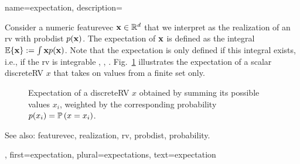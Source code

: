 {name={expectation},
	description={Consider a numeric \gls{featurevec} ${\bf x} \in \mathbb{R}^{d}$ 
		that we interpret as the \gls{realization} of an \gls{rv} with \gls{probdist} $p({\bf x})$. 
		The expectation of ${\bf x}$ is defined as the integral $\mathbb{E} \{ {\bf x} \} := \int {\bf x} p({\bf x})$. 
		Note that the expectation is only defined if this integral exists, i.e., if the \gls{rv} is \gls{integrable} 
		\cite{RudinBookPrinciplesMatheAnalysis}, \cite{BillingsleyProbMeasure}, \cite{HalmosMeasure}. 
		Fig.\ \ref{fig_expect_discrete_dict} illustrates the expectation of a scalar \gls{discreteRV} $x$ that takes on values 
		from a finite set only. 
   		\begin{figure}[H]
   			\begin{center}
			\end{center}
			\vspace*{-5mm}
		\caption{Expectation of a \gls{discreteRV} $x$ obtained by summing its possible values $x_{i}$, weighted 
			by the corresponding \gls{probability} $p(x_i) = \mathbb{P}\left(x= x_i\right)$. \label{fig_expect_discrete_dict}}
 		\end{figure}
		See also: \gls{featurevec}, \gls{realization}, \gls{rv}, \gls{probdist}, \gls{probability}.},
	first={expectation},
	plural={expectations},
	text={expectation}
}

